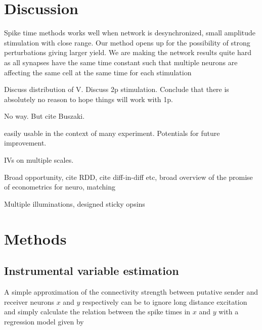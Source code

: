 \documentclass[11pt]{article}
\begin{document}
\section{Discussion}
Spike time methods works well when network is desynchronized, small amplitude stimulation with close range. Our method opens up for the possibility of strong perturbations giving larger yield.
We are making the network results quite hard as all synapses have the same time constant such that multiple neurons are affecting the same cell at the same time for each stimulation


Discuss distribution of V. Discuss 2p stimulation.  Conclude that there is absolutely no reason to hope things will work with 1p.

No way. But cite Buszaki.

easily usable in the context of many experiment. Potentials for future improvement.

IVs on multiple scales. 

Broad opportunity, cite RDD, cite diff-in-diff etc, broad overview of the promise of econometrics for neuro, matching

Multiple illuminations, designed sticky opsins


\FloatBarrier
\section{Methods}
\subsection{Instrumental variable estimation}
A simple approximation of the connectivity strength between putative sender and receiver neurons $ x $ and $ y $ respectively can be to ignore long distance excitation and simply calculate the relation between the spike times in $ x $ and $ y $ with a regression model given by
\end{document}
